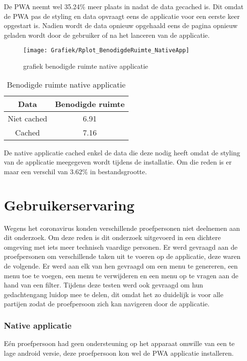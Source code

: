 De PWA neemt wel 35.24\% meer plaats in nadat de data gecached is. Dit omdat de PWA pas de styling en data opvraagt eens de applicatie voor een eerste keer opgestart is. Nadien wordt de data opnieuw opgehaald eens de pagina opnieuw geladen wordt door de gebruiker of na het lanceren van de applicatie.

\begin{figure}[H]
	\texttt{[image: Grafiek/Rplot\_BenodigdeRuimte\_NativeApp]}\centering
	\caption{grafiek benodigde ruimte native applicatie}
\end{figure}

\begin{table}[h!]
	\centering
	\begin{tabular}{|c|c|}
		\hline
		Data             & Benodigde ruimte \\
		\hline
		Niet cached       & 6.91             \\
		\hline
		Cached            & 7.16             \\
		\hline
	\end{tabular}
	\label{table:6}
	\caption{Benodigde ruimte native applicatie}
\end{table}

De native applicatie cached enkel de data die deze nodig heeft omdat de styling van de applicatie meegegeven wordt tijdens de installatie. Om die reden is er maar een verschil van 3.62\% in bestandsgrootte.

\section{Gebruikerservaring}
Wegens het coronavirus konden verschillende proefpersonen niet deelnemen aan dit onderzoek. Om deze reden is dit onderzoek uitgevoerd in een dichtere omgeving met iets meer technisch vaardige personen. Er werd gevraagd aan de proefpersonen om verschillende taken uit te voeren op de applicatie, deze waren de volgende. Er werd aan elk van hen gevraagd om een menu te genereren, een menu toe te voegen, een menu te verwijderen en een menu op te vragen aan de hand van een filter. Tijdens deze testen werd ook gevraagd om hun gedachtengang luidop mee te delen, dit omdat het zo duidelijk is voor alle partijen zodat de proefpersoon zich kan navigeren door de applicatie.

\subsubsection{Native applicatie}
Eén proefpersoon had geen ondersteuning op het apparaat omwille van een te lage android versie, deze proefpersoon kon wel de PWA applicatie installeren.

